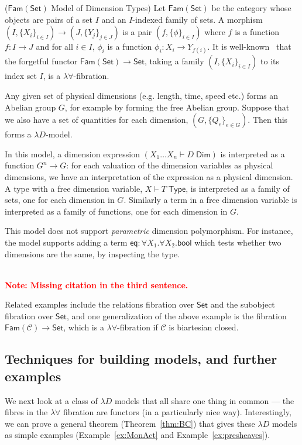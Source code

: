 \documentclass[a4paper,UKenglish]{lipics}
\newcommand\note[1]{{ \bf \textcolor{red} {\vspace{2mm}\; \\ Note: #1\\}}}
\newcommand{\msf}[1]{\mathsf{#1}} %
\newcommand{\Set}{\msf{Set}}
\newcommand{\Fam}[1]{\msf{Fam}(#1)}
\newcommand{\C}{\mathcal{C}}
\newcommand{\bool}{\msf{bool}}
\newcommand{\Tj}[2]{#1 \vdash #2 \; \msf{ Type}}
\newcommand{\Dj}[2]{#1 \vdash #2 \; \msf{ Dim}}
\newcommand{\Dim}{D}
\newcommand{\Dvar}{X}
\begin{document}
\begin{example}($\Fam\Set$ Model of Dimension Types) \label{example:famset}
\noindent Let $\Fam\Set$ be the category whose objects are pairs of a set $I$ and an $I$-indexed family of sets. A morphism $(I,\{X_i\}_{i\in I})\to (J,\{Y_j\}_{j\in J})$ is a pair $(f,\{\phi\}_{i\in I})$ where $f$ is a function $f:I\to J$ and for all $i\in I$, $\phi_i$ is a function $\phi_i:X_i\to Y_{f(i)}$. It is well-known~\cite{} that the forgetful functor $\Fam\Set\to \Set$, taking a family $(I,\{X_i\}_{i\in I})$ to its index set $I$, is a $\lambda\forall$-fibration.

Any given set of physical dimensions (e.g. length, time, speed etc.) forms an Abelian group $G$, for example by forming the free Abelian group. Suppose that we also have a set of quantities for each dimension, $(G,\{Q_e\}_{e\in G})$. Then this forms a $\lambda D$-model.

In this model, a dimension expression $(\Dj{\Dvar_1\dots \Dvar_n} \Dim)$ is interpreted as a function $G^n\to G$: for each valuation of the dimension variables as physical dimensions, we have an interpretation of the expression as a physical dimension. A type with a free dimension variable, $\Tj \Dvar T$, is interpreted as a family of sets, one for each dimension in $G$. Similarly a term in a free dimension variable is interpreted as a family of functions, one for each dimension in $G$.

This model does not support \emph{parametric} dimension polymorphism. For instance, the model supports adding a term $\mathsf{eq}:\forall \Dvar_1.\forall \Dvar_2.\bool$ which tests whether two dimensions are the same, by inspecting the type.

\note{Missing citation in the third sentence.}
\end{example}


Related examples include the relations fibration over $\Set$ and the subobject fibration over $\Set$, and one generalization of the above example is the fibration $\Fam{\C}\to\Set$, which is a $\lambda\forall$-fibration if $\C$ is biartesian closed.

\subsection{Techniques for building models, and further examples}

We next look at a class of $\lambda D$ models that all share one thing in common --- the fibres in the $\lambda \forall$ fibration are functors (in a particularly nice way). Interestingly, we can prove a general theorem (Theorem~\ref{thm:BC}) that gives these $\lambda D$ models as simple examples (Example~\ref{ex:MonAct} and Example~\ref{ex:presheaves}).
\end{document}
